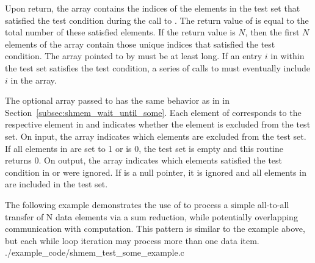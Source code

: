 \begin{apidefinition}
{    Upon return, the  array contains the indices of the elements
    in the test set that satisfied the test condition during the call to
    .  The return value of  is
    equal to the total number of these satisfied elements.  If the return value
    is $N$, then the first $N$ elements of the  array contain
    those unique indices that satisfied the test condition.  The array pointed
    to by  must be at least  long.
    If an entry $i$ in  within the test set satisfies the test
    condition, a series of calls to  must eventually
    include $i$ in the  array.

    The optional  array passed to  has the
    same behavior as in  in
    Section~\ref{subsec:shmem_wait_until_some}.   Each element of 
    corresponds to the respective element in  and indicates whether
    the element is excluded from the test set.  On input, the 
    array indicates which elements are excluded from the test set.  If all
    elements in  are set to 1 or  is 0, the test set is
    empty and this routine returns 0.  On output, the  array
    indicates which elements satisfied the test condition in  or
    were ignored.  If  is a null pointer, it is ignored and all
    elements in  are included in the test set.
}



\begin{apiexamples}
  \apicexample
      {The following \CorCpp{} example demonstrates the use of
       to process a simple all-to-all transfer of N
      data elements via a sum reduction, while potentially overlapping
      communication with computation.  This pattern is similar to the
       example above, but each while loop iteration may
      process more than one data item.}
      {./example_code/shmem_test_some_example.c}
      {}
\end{apiexamples}

\end{apidefinition}
